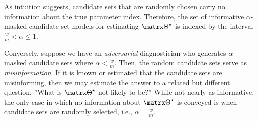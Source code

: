 \documentclass[../main.tex]{subfiles}
\begin{document}
As intuition suggests, candidate sets that are randomly chosen carry no information about the true parameter index.
Therefore, the set of informative $\alpha$-masked candidate set models for estimating $\tparam\sysparam$ is indexed by the interval $\frac{w}{m} < \alpha \leq 1$.
\begin{remark}
Conversely, suppose we have an \emph{adversarial} diagnostician who generates $\alpha$-masked candidate sets where $\alpha < \frac{w}{m}$.
Then, the random candidate sets serve as \emph{misinformation}.
If it is known or estimated that the candidate sets are misinforming, then we may estimate the answer to a related but different question, ''What is $\tparam\sysparam$ not likely to be?''
While not nearly as informative, the only case in which no information about $\tparam\sysparam$ is conveyed is when candidate sets are randomly selected, i.e., $\alpha = \frac{w}{m}$.
\end{remark}
\end{document}
